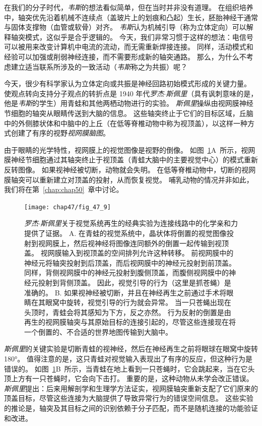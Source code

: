在我们的分子时代，\textit{韦斯}的想法看似简单，但在当时并非没有道理。
在组织培养中，轴突优先沿着机械不连续点（盖玻片上的划痕和凸起）生长，胚胎神经干通常与固体支撑物（血管或软骨）对齐。
\textit{韦斯}认为机械引导（称为立体定向）可以解释轴突模式，这似乎是合乎逻辑的。
今天，我们非常习惯于这样的想法：电信号可以被用来改变计算机中电流的流动，而无需重新焊接连接。
同样，活动模式和经验可以加强或削弱神经连接，而不需要形成新的轴突通路。
那么，为什么不考虑建立适当联系所涉及的一致活动（\textit{韦斯}称之为共振）呢？


今天，很少有科学家认为立体定向或共振是神经回路初始模式形成的关键力量。
使观点转向支持分子观点的转折点是 1940 年代\textit{罗杰$\cdot$斯佩里}（具有讽刺意味的是，他是\textit{韦斯}的学生）用青蛙和其他两栖动物进行的实验。
\textit{斯佩里}操纵由视网膜神经节细胞的轴突从眼睛传送到大脑的信息。
这些轴突终止于它们的目标区域，丘脑中的外侧膝状体和中脑中的上丘（在低等脊椎动物中称为视顶盖），以这样一种方式创建了有序的视野\textit{视网膜脑图}。


由于眼睛的光学特性，视网膜上的视觉图像是视野的倒像。
如图~\ref{fig:47_9}A~所示，视网膜神经节细胞通过其轴突终止于视顶盖（青蛙大脑中的主要视觉中心）的模式重新反转图像。
如果视神经被切断，动物就会失明。
在低等脊椎动物中，切断的视网膜轴突可以重新建立对顶盖的投射，从而恢复视觉。
哺乳动物的情况并非如此，我们将在第~\ref{chap:chap50}~章中讨论。


\begin{figure}[htbp]
	\centering
	\texttt{[image: chap47/fig\_47\_9]}
	\caption{\textit{罗杰$\cdot$斯佩里}关于视觉系统再生的经典实验为连接线路中的化学亲和力提供了证据。
		A. 在青蛙的视觉系统中，晶状体将倒置的视觉图像投射到视网膜上，然后视神经将图像连同额外的倒置一起传输到视顶盖。
		视网膜输入到视顶盖的空间排列允许这种转移。
		前视网膜中的神经元将轴突投射到后顶盖，而后视网膜中的神经元投射到前顶盖。
		同样，背侧视网膜中的神经元投射到腹侧顶盖，而腹侧视网膜中的神经元投射到背侧顶盖。
		因此，视觉引导的行为（这里是抓苍蝇）是准确的。
		B. 如果视神经被切断，并且在神经再生之前通过手术将眼睛在其眼窝中旋转，视觉引导的行为就会异常。
		当一只苍蝇出现在头顶时，青蛙会将其感知为下方，反之亦然。
		行为反射的倒置是由再生的视网膜轴突与其原始目标的连接引起的，尽管这些连接现在将一个倒置的、不合适的世界地图传输到大脑中。}
	\label{fig:47_9}
\end{figure}


\textit{斯佩里}的关键实验是切断青蛙的视神经，然后在神经再生之前将眼球在眼窝中旋转 180°。
值得注意的是，这只青蛙对视觉输入表现出了有序的反应，但这种行为是错误的。
如图~\ref{fig:47_9}B~所示，当青蛙在地上看到一只苍蝇时，它会跳起来，当在它头顶上方有一只苍蝇时，它会向下击打。
重要的是，这种动物从未学会改正错误。
\textit{斯佩里}提出：后来用解剖学和生理学方法证实，视网膜轴突重新支配了它们原来的顶盖目标，尽管这些连接为大脑提供了导致异常行为的错误空间信息。
这些实验的推论是，轴突及其目标之间的识别依赖于分子匹配，而不是随机连接的功能验证和改进。


